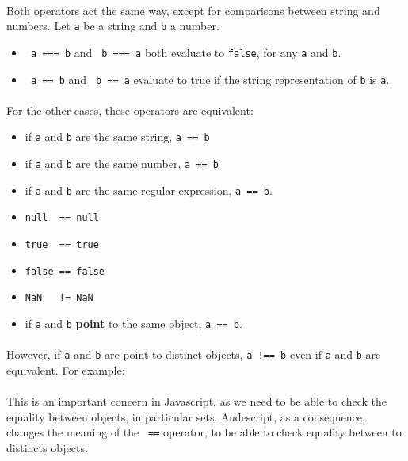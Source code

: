 \documentclass{article}
\begin{document}
\begin{sloppypar}
      
\paragraph{}
Both operators act the same way, except for comparisons between string and numbers. Let \verb!a! be a string and \verb!b! a number.
       
\begin{itemize}
	\item{ \verb! a === b! and \verb! b === a! both evaluate to \verb!false!, for any \verb!a! and \verb!b!.}
	\item{ \verb! a == b! and \verb! b == a!   evaluate to true if the string representation of \verb!b! is \verb!a!.}
\end{itemize}

\paragraph{}
For the other cases, these operators are equivalent:
       
\begin{itemize}
	\item{ if \verb!a! and \verb!b! are the same string, \verb!a == b!}
	\item{ if \verb!a! and \verb!b! are the same number, \verb!a == b!}
	\item{ if \verb!a! and \verb!b! are the same regular expression, \verb!a == b!.}
	\item{ \verb!null  == null!}
	\item{ \verb!true  == true!}
	\item{ \verb!false == false!}
	\item{ \verb"NaN   != NaN"}
	\item{ if \verb!a! and \verb!b! {\bfseries point} to the same object, \verb!a == b!.}
\end{itemize}

\paragraph{}
However, if \verb!a! and \verb!b! are point to distinct objects, \verb"a !== b" even if \verb!a! and \verb!b! are equivalent. For example:
       {}

       
\paragraph{}
This is an important concern in Javascript, as we need to be able to check the equality between objects, in particular sets. Audescript, as a consequence, changes the meaning of the \verb! ==! operator, to be able to check equality between to distincts objects.


\end{sloppypar}
\end{document}
